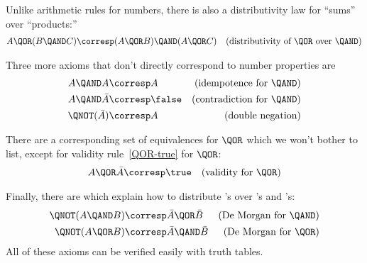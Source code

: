 Unlike arithmetic rules for numbers, there is also a distributivity
law for ``sums'' over ``products:''
\begin{align}
A \QOR (B \QAND C) & \corresp (A \QOR B) \QAND (A \QOR C)
             & \text{(distributivity of \QOR\ over \QAND)}\label{distor}
\end{align}

\iffalse
Similarly, we have (Problem~\ref{TP_truth_table_for_distributive_law}):
\begin{theorem}\label{thm:distribute-or-and}[Distributive Law of $\QOR$ over $\QAND$]
\[
A \QOR (B \QAND C)\text{ is equivalent to } (A \QOR B) \QAND (A \QOR
C).
\]
\end{theorem}
\index{Distributive Law!$\QOR$ over $\QAND$|textbf}
Note the contrast between Theorem~\ref{thm:distribute-or-and} and
arithmetic, where sums do not distribute over products.
\fi

Three more axioms that don't directly correspond to number properties
are
\begin{align}
A \QAND A       &\corresp A
         & \text{(idempotence for \QAND)}\notag\\
A \QAND \bar{A} & \corresp \false
         & \text{(contradiction for \QAND)}\label{QAND-contra}\\
\QNOT(\bar{A})  & \corresp A
         & \text{(double negation)}\label{double-neg}
\end{align}

There are a corresponding set of equivalences for $\QOR$ which we
won't bother to list, except for validity rule~\eqref{QOR-true} for
$\QOR$:
\begin{align}
A \QOR \bar{A} & \corresp \true  & \text{(validity for \QOR)}\label{QOR-true}
\end{align}

\iffalse
There is also a familiar rule connecting \QAND\ and \QOR:
\begin{align}
\lefteqn{A \QAND (B \QOR C)}\notag\\
 & \corresp (A \QAND B) \QOR (A \QAND C) &\qquad \text{(distributivity
  of \QAND\ over \QOR)}\label{qand-distributivity}
\end{align}
\fi

Finally, there are  which explain how to distribute
\QNOT's over \QAND's and \QOR's:
\begin{align}
\QNOT(A \QAND B) &\corresp \bar{A} \QOR \bar{B} & \text{(De Morgan for \QAND)} \label{DeMQAND}\\
\QNOT(A \QOR B) &\corresp \bar{A} \QAND \bar{B} & \text{(De Morgan for \QOR)}
\label{DeMQOR} 
\end{align}
All of these axioms can be verified easily with truth tables.

